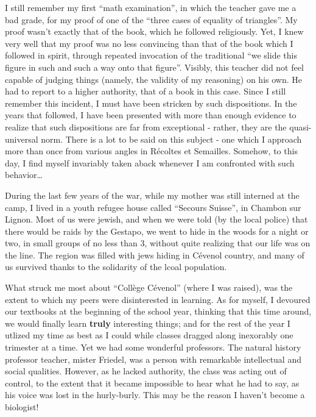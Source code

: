 I still remember my first ``math examination'', in which the teacher gave me a bad grade,
for my proof of one of the ``three cases of equality of triangles''. 
My proof wasn't exactly that of the book, which he followed religiously. 
Yet, I knew very well that my proof was no less convincing than that of the book which I
followed in spirit, through repeated invocation of the traditional
``we slide this figure in such and such a way onto that figure''. 
Visibly, this teacher did not feel capable of judging things (namely, the
validity of my reasoning) on his own. He had to report to a higher authority, that of a book in this
case. Since I still remember this
incident, I must have been stricken by such dispositions. In the years that followed, I have been presented with more than enough evidence to realize
that such dispositions are far from exceptional - rather, they are the quasi-universal
norm. There is a lot to be said on this subject - one which I approach more than once from various angles in 
R\'ecoltes et Semailles. Somehow, to this day, I find myself invariably 
taken aback whenever I am confronted with such behavior\ldots

During the last few years of the war, while my mother was still interned at the camp, I
lived in a youth refugee house called ``Secours Suisse'', in Chambon sur Lignon. Most of
us were jewish, and when we were told (by the local police) that there would be raids by
the Gestapo, we went to hide in the woods for a night or two, in small groups of no less
than 3, without quite realizing that our life was on the line.
The region was filled with jews hiding in C\'evenol country, and many of us survived
thanks to the solidarity of the lcoal population.

What struck me most about
``Coll\`ege C\'evenol'' (where I was raised), was the extent to which my peers were
disinterested in learning. As for myself, I devoured our textbooks at the beginning of the
school year, thinking that this time around, we would finally learn \textbf{truly}
interesting things; and for 
the rest of the year I utlized my time as best as I could while classes dragged along
inexorably one trimester at a time. Yet we had some wonderful professors. The natural
history professor teacher, mister Friedel, was a person with remarkable intellectual and
social qualities. However, as he lacked authority, the class was acting out of control, to
the extent that it became impossible to hear what he had to say, as his voice was lost in
the hurly-burly. This may be the reason I haven't become a biologist! 


